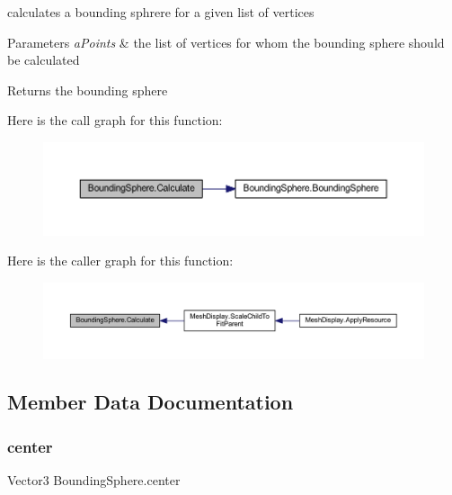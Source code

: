calculates a bounding sphrere for a given list of vertices 


\begin{DoxyParams}{Parameters}
{\em a\+Points} & the list of vertices for whom the bounding sphere should be calculated\\
\hline
\end{DoxyParams}
\begin{DoxyReturn}{Returns}
the bounding sphere
\end{DoxyReturn}
Here is the call graph for this function\+:
\nopagebreak
\begin{figure}[H]
\begin{center}
\leavevmode
\includegraphics[width=350pt]{class_bounding_sphere_a29c277d13a701089666b94fabf3c87d6_cgraph}
\end{center}
\end{figure}
Here is the caller graph for this function\+:
\nopagebreak
\begin{figure}[H]
\begin{center}
\leavevmode
\includegraphics[width=350pt]{class_bounding_sphere_a29c277d13a701089666b94fabf3c87d6_icgraph}
\end{center}
\end{figure}


\subsection{Member Data Documentation}
\mbox{\label{class_bounding_sphere_a0996d0f450c5e7fcca8446ebbd8ddc20}} 
\subsubsection{\texorpdfstring{center}{center}}
{\footnotesize\ttfamily Vector3 Bounding\+Sphere.\+center}



